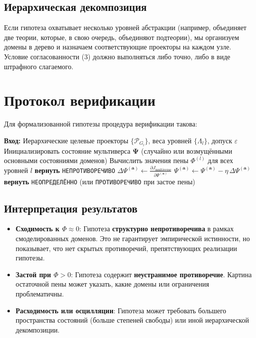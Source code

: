 \documentclass[11pt,a4paper]{article}
\begin{document}
\subsection{Иерархическая декомпозиция}

Если гипотеза охватывает несколько уровней абстракции (например, объединяет две теории, которые, в свою очередь, объединяют подтеории), мы организуем домены в дерево и назначаем соответствующие проекторы на каждом узле. Условие согласованности (3) должно выполняться либо точно, либо в виде штрафного слагаемого.

\section{Протокол верификации}

Для формализованной гипотезы процедура верификации такова:

\begin{algorithm}[H]
\caption{GRA Обнуление мультиверса}
\begin{algorithmic}[1]
\State \textbf{Вход:} Иерархические целевые проекторы \(\{\mathcal{P}_{G_l}\}\), веса уровней \(\{\Lambda_l\}\), допуск \(\varepsilon\)
\State Инициализировать состояние мультиверса \(\mathbf{\Psi}\) (случайно или возмущёнными основными состояниями доменов)
\Repeat
\State Вычислить значения пены \(\Phi^{(l)}\) для всех уровней \(l\)
\State \textbf{вернуть} \texttt{НЕПРОТИВОРЕЧИВО}
\EndIf
{}
\State \(\displaystyle \Delta \Psi^{(\mathbf{a})} \leftarrow \frac{\partial J_{\text{multiverse}}}{\partial \Psi^{(\mathbf{a})}}\) 
\State \(\Psi^{(\mathbf{a})} \leftarrow \Psi^{(\mathbf{a})} - \eta \, \Delta \Psi^{(\mathbf{a})}\)
\EndFor
{}
\State \textbf{вернуть} \texttt{НЕОПРЕДЕЛЁННО} (или \texttt{ПРОТИВОРЕЧИВО} при застое пены)
\end{algorithmic}
\end{algorithm}

\subsection{Интерпретация результатов}
\begin{itemize}
    \item \textbf{Сходимость к \(\Phi \approx 0\)}: Гипотеза \textbf{структурно непротиворечива} в рамках смоделированных доменов. Это не гарантирует эмпирической истинности, но показывает, что нет скрытых противоречий, препятствующих реализации гипотезы.
    \item \textbf{Застой при \(\Phi > 0\)}: Гипотеза содержит \textbf{неустранимое противоречие}. Картина остаточной пены может указать, какие домены или ограничения проблематичны.
    \item \textbf{Расходимость или осцилляции}: Гипотеза может требовать большего пространства состояний (больше степеней свободы) или иной иерархической декомпозиции.
\end{itemize}
\end{document}

